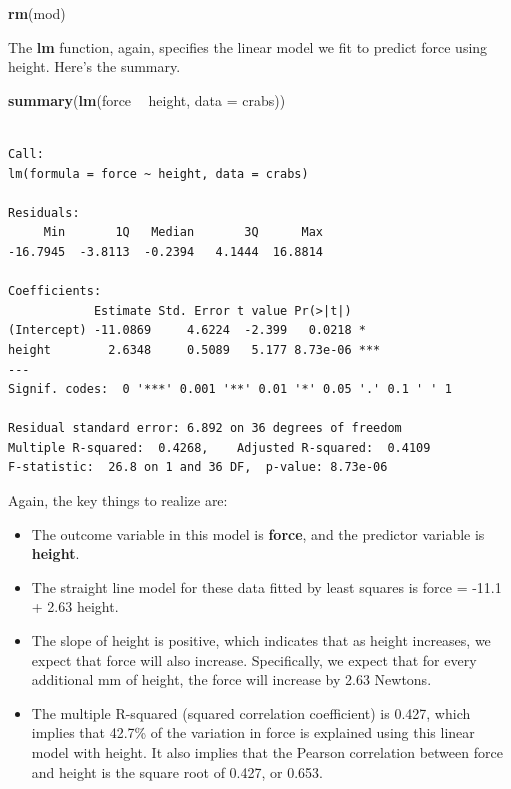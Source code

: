 \documentclass[
]{book}
\newenvironment{Shaded}{\begin{snugshade}}{\end{snugshade}}
\newcommand{\DataTypeTok}[1]{\textcolor[rgb]{0.13,0.29,0.53}{#1}}
\newcommand{\KeywordTok}[1]{\textcolor[rgb]{0.13,0.29,0.53}{\textbf{#1}}}
\newcommand{\NormalTok}[1]{#1}
\newcommand{\OperatorTok}[1]{\textcolor[rgb]{0.81,0.36,0.00}{\textbf{#1}}}
\newcommand{\StringTok}[1]{\textcolor[rgb]{0.31,0.60,0.02}{#1}}
\providecommand{\tightlist}{%
  \setlength{\itemsep}{0pt}\setlength{\parskip}{0pt}}
\begin{document}
\begin{Shaded}
\begin{Highlighting}[]
\KeywordTok{rm}\NormalTok{(mod)}
\end{Highlighting}
\end{Shaded}

The \textbf{lm} function, again, specifies the linear model we fit to predict force using height. Here's the summary.

\begin{Shaded}
\begin{Highlighting}[]
\KeywordTok{summary}\NormalTok{(}\KeywordTok{lm}\NormalTok{(force }\OperatorTok{~}\StringTok{ }\NormalTok{height, }\DataTypeTok{data =}\NormalTok{ crabs))}
\end{Highlighting}
\end{Shaded}

\begin{verbatim}

Call:
lm(formula = force ~ height, data = crabs)

Residuals:
     Min       1Q   Median       3Q      Max 
-16.7945  -3.8113  -0.2394   4.1444  16.8814 

Coefficients:
            Estimate Std. Error t value Pr(>|t|)    
(Intercept) -11.0869     4.6224  -2.399   0.0218 *  
height        2.6348     0.5089   5.177 8.73e-06 ***
---
Signif. codes:  0 '***' 0.001 '**' 0.01 '*' 0.05 '.' 0.1 ' ' 1

Residual standard error: 6.892 on 36 degrees of freedom
Multiple R-squared:  0.4268,	Adjusted R-squared:  0.4109 
F-statistic:  26.8 on 1 and 36 DF,  p-value: 8.73e-06
\end{verbatim}

Again, the key things to realize are:

\begin{itemize}
\tightlist
\item
  The outcome variable in this model is \textbf{force}, and the predictor variable is \textbf{height}.
\item
  The straight line model for these data fitted by least squares is force = -11.1 + 2.63 height.
\item
  The slope of height is positive, which indicates that as height increases, we expect that force will also increase. Specifically, we expect that for every additional mm of height, the force will increase by 2.63 Newtons.
\item
  The multiple R-squared (squared correlation coefficient) is 0.427, which implies that 42.7\% of the variation in force is explained using this linear model with height. It also implies that the Pearson correlation between force and height is the square root of 0.427, or 0.653.
\end{itemize}
\end{document}
